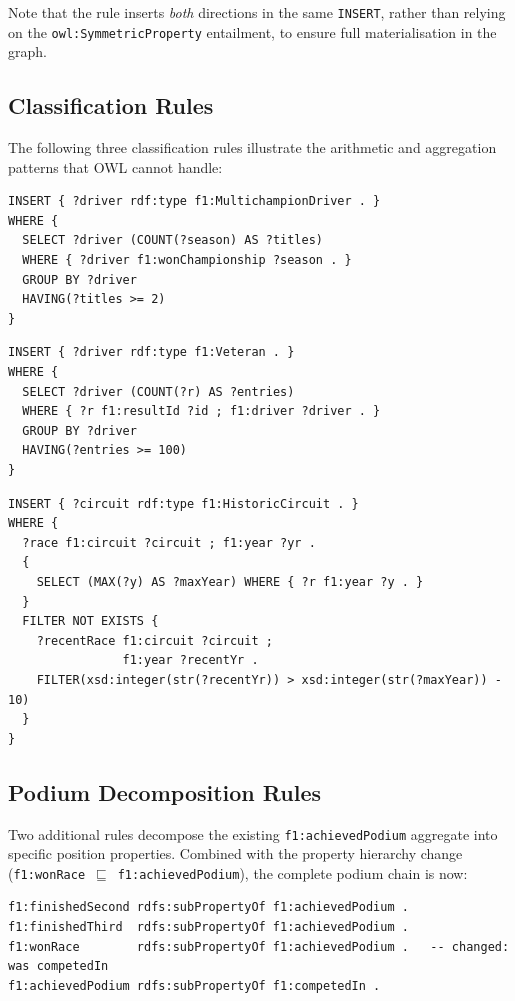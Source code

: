 \documentclass[12pt,a4paper]{article}
\begin{document}
Note that the rule inserts \emph{both} directions in the same \texttt{INSERT}, rather
than relying on the \texttt{owl:SymmetricProperty} entailment, to ensure full
materialisation in the graph.

\subsection{Classification Rules}

The following three classification rules illustrate the arithmetic and aggregation
patterns that OWL cannot handle:

\begin{lstlisting}[style=sparql, caption={classify\_MultichampionDriver: COUNT aggregation}]
INSERT { ?driver rdf:type f1:MultichampionDriver . }
WHERE {
  SELECT ?driver (COUNT(?season) AS ?titles)
  WHERE { ?driver f1:wonChampionship ?season . }
  GROUP BY ?driver
  HAVING(?titles >= 2)
}
\end{lstlisting}

\begin{lstlisting}[style=sparql, caption={classify\_Veteran: COUNT results $\geq$ 100}]
INSERT { ?driver rdf:type f1:Veteran . }
WHERE {
  SELECT ?driver (COUNT(?r) AS ?entries)
  WHERE { ?r f1:resultId ?id ; f1:driver ?driver . }
  GROUP BY ?driver
  HAVING(?entries >= 100)
}
\end{lstlisting}

\begin{lstlisting}[style=sparql, caption={classify\_HistoricCircuit: MAX(year) arithmetic + negation}]
INSERT { ?circuit rdf:type f1:HistoricCircuit . }
WHERE {
  ?race f1:circuit ?circuit ; f1:year ?yr .
  {
    SELECT (MAX(?y) AS ?maxYear) WHERE { ?r f1:year ?y . }
  }
  FILTER NOT EXISTS {
    ?recentRace f1:circuit ?circuit ;
                f1:year ?recentYr .
    FILTER(xsd:integer(str(?recentYr)) > xsd:integer(str(?maxYear)) - 10)
  }
}
\end{lstlisting}

\subsection{Podium Decomposition Rules}

Two additional rules decompose the existing \texttt{f1:achievedPodium} aggregate
into specific position properties. Combined with the property hierarchy change
(\texttt{f1:wonRace}~$\sqsubseteq$~\texttt{f1:achievedPodium}), the complete podium chain is now:

\begin{lstlisting}[style=turtle, caption={Updated property subPropertyOf chain (verified by HermiT)}]
f1:finishedSecond rdfs:subPropertyOf f1:achievedPodium .
f1:finishedThird  rdfs:subPropertyOf f1:achievedPodium .
f1:wonRace        rdfs:subPropertyOf f1:achievedPodium .   -- changed: was competedIn
f1:achievedPodium rdfs:subPropertyOf f1:competedIn .
\end{lstlisting}
\end{document}
